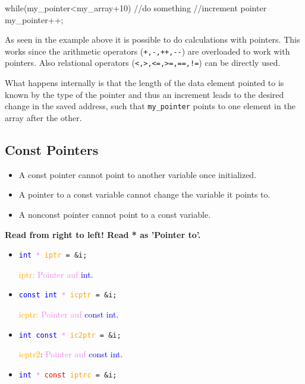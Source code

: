 \documentclass[10pt,a4paper]{scrartcl}
\begin{document}
\begin{multicols*}{2}
\begin{TPCpp}
while(my_pointer<my_array+10){
	//do something
	//increment pointer
	my_pointer++;
}
\end{TPCpp}

As seen in the example above it is possible to do calculations with pointers. This works since the arithmetic operators (\verb.+,-,++,--.) are overloaded to work with pointers. Also relational operators (\verb.<,>,<=,>=,==,!=.) can be directly used.

What happens internally is that the length of the data element pointed to is known by the type of the pointer and thus an increment leads to the desired change in the saved address, such that \verb+my_pointer+ points to one element in the array after the other.

\subsection{Const Pointers}
\label{sec:ConstPointers}

\begin{itemize}
\item A const pointer cannot point to another variable once initialized.
\item A pointer to a const variable cannot change the variable it points to.
\item A nonconst pointer cannot point to a const variable.
\end{itemize}

\textbf{Read from right to left! Read * as  'Pointer to'.}

\vspace{3ex}

\begin{minipage}[t]{0.4\linewidth}
\begin{itemize}
\item \texttt{\textcolor{blue}{int} \textcolor{violet}{*} \textcolor{orange}{iptr} = \&i;}

\textcolor{orange}{iptr:} \textcolor{violet}{Pointer auf} \textcolor{blue}{int}.
\item \texttt{\textcolor{blue}{const int}\textcolor{violet}{ *} \textcolor{orange}{icptr} = \&i;}

\textcolor{orange}{icptr:} \textcolor{violet}{Pointer auf} \textcolor{blue}{const int}.
\item \texttt{\textcolor{blue}{int const} \textcolor{violet}{*} \textcolor{orange}{ic2ptr} = \&i;}

\textcolor{orange}{icptr2}: \textcolor{violet}{Pointer auf} \textcolor{blue}{const int}.
\end{itemize}
\end{minipage}
\hfill
\begin{minipage}[t]{0.5\linewidth}
\begin{itemize}
\item \texttt{\textcolor{blue}{int} \textcolor{violet}{*} \textcolor{red}{const} \textcolor{orange}{iptrc} = \&i;}


\end{itemize}
\end{minipage}
\end{multicols*}
\end{document}
